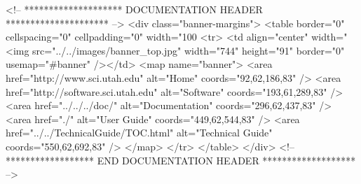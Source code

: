\documentclass[11pt]{article}
\begin{document}


\begin{rawhtml}
<!-- ******************** DOCUMENTATION HEADER ********************* -->
<div class="banner-margins">
<table border="0" cellspacing="0" cellpadding="0" width="100%
<tr>
<td align="center" width="%
<img src="../../images/banner_top.jpg" width="744" height="91" border="0" usemap="#banner" /></td>
<map name="banner">
<area href="http://www.sci.utah.edu" alt="Home" coords="92,62,186,83" />
<area href="http://software.sci.utah.edu" alt="Software" coords="193,61,289,83" />
<area href="../../../doc/" alt="Documentation" coords="296,62,437,83" />
<area href="./" alt="User Guide" coords="449,62,544,83" />
<area href="../../TechnicalGuide/TOC.html" alt="Technical Guide" coords="550,62,692,83" />
</map>
</tr>
</table>
</div>
<!-- ****************** END DOCUMENTATION HEADER ******************* -->
\end{rawhtml}


\newpage
\tableofcontents
\newpage



\newpage




%

%

\newpage
%
\newpage
%

\newpage


\newpage
\printindex
\end{document}
